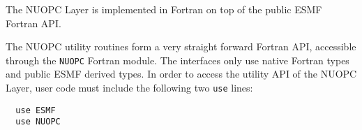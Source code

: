 
The NUOPC Layer is implemented in Fortran on top of the public ESMF Fortran API.

The NUOPC utility routines form a very straight forward Fortran API, accessible through the {\tt NUOPC} Fortran module. The interfaces only use native Fortran types and public ESMF derived types. In order to access the utility API of the NUOPC Layer, user code must include the following two {\tt use} lines:

\begin{verbatim}
  use ESMF
  use NUOPC
\end{verbatim}
